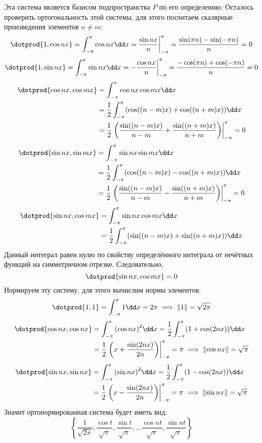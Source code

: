 Эта система является базисом подпространства \(P\)
по его определению.
Осталось проверить ортогональность этой системы, для этого посчитаем
скалярные произведения элементов \(n \neq m\):
\[
  \dotprod{1, \cos nx} = \int_{-\pi}^{\pi} \cos nx \dd x
  = \frac{\sin nx}{n} \bigg\vert_{-\pi}^{\pi}
  = \frac{\sin(\pi n) - \sin(-\pi n)}{n} = 0
\]
\[
  \dotprod{1, \sin nx} = \int_{-\pi}^{\pi} \sin nx \dd x
  = -\frac{\cos nx}{n} \bigg\vert_{-\pi}^{\pi}
  = \frac{-\cos(\pi n) + \cos(-\pi n)}{n} = 0
\]
\[
\begin{split}
  \dotprod{\cos nx, \cos mx}
  &= \int_{-\pi}^{\pi} \cos nx \cos mx \dd x \\
  &= \frac{1}{2}
    \int_{-\pi}^{\pi} (\cos((n - m) x) + \cos((n + m) x)) \dd x \\
  &= \frac{1}{2} \left.\left(
      \frac{\sin((n - m) x)}{n - m} + \frac{\sin((n + m) x)}{n + m}
  \right) \right\vert_{-\pi}^{\pi} = 0
\end{split}
\]
\[
\begin{split}
  \dotprod{\sin nx, \sin mx}
  &= \int_{-\pi}^{\pi} \sin nx \sin mx \dd x \\
  &= \frac{1}{2} \int_{-\pi}^{\pi} (\cos((n - m) x) - \cos((n + m) x)) \dd x \\
  &= \frac{1}{2} \left.\left(
      \frac{\sin((n - m) x)}{n - m} - \frac{\sin((n + m) x)}{n + m}
  \right) \right\vert_{-\pi}^{\pi} = 0
\end{split}
\]
\[
\begin{split}
  \dotprod{\sin nx, \cos mx}
  &= \int_{-\pi}^{\pi} \sin nx \cos mx \dd x \\
  &= \frac{1}{2} \int_{-\pi}^{\pi} (\sin((n - m) x) + \sin((n + m) x)) \dd x
\end{split}
\]
Данный интеграл равен нулю по свойству определённого интеграла
от нечётных функций на симметричном отрезке. Следовательно,
\[\dotprod{\sin nx, \cos mx} = 0\]
Нормируем эту систему, для этого вычислим нормы элементов:
\[
  \dotprod{1,1}
  = \int_{-\pi}^{\pi} 1 \dd x
  = 2\pi
  \implies
  \lVert 1 \rVert
  = \sqrt{2 \pi}
\]
\[
\begin{split}
\dotprod{\cos nx, \cos nx}
  &= \int_{-\pi}^{\pi} {(\cos nx)}^2 \dd x
  = \frac{1}{2} \int_{-\pi}^{\pi} (1 + \cos(2nx)) \dd x \\
  &= \frac{1}{2} \left.
    \left( x + \frac{\sin(2nx)}{2n} \right)
    \right\rvert_{-\pi}^{\pi} = \pi
  \implies \lVert \cos nx \rVert = \sqrt{\pi}
\end{split}
\]
\[
\begin{split}
  \dotprod{\sin nx, \sin nx}
  &= \int_{-\pi}^{\pi} {(\sin nx)}^2 \dd x
  = \frac{1}{2} \int_{-\pi}^{\pi} (1 - \cos(2nx)) \dd x \\
  &= \frac{1}{2} \left.
    \left( x - \frac{\sin(2nx)}{2n} \right)
    \right\rvert_{-\pi}^{\pi} = \pi
  \implies \lVert \sin nx \rVert = \sqrt{\pi}
\end{split}
\]
Значит ортонормированная система будет иметь вид:
\[
  \left\{
    \frac{1}{\sqrt{2 \pi}},
    \frac{\cos t}{\sqrt{\pi}},
    \frac{\sin t}{\sqrt{\pi}},
    \ldots
    \frac{\cos nt}{\sqrt{\pi}},
    \frac{\sin nt}{\sqrt{\pi}}
  \right\}
\]

